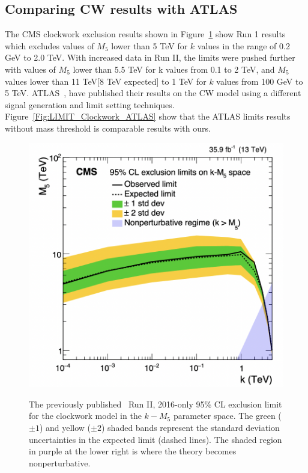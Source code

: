 
\subsection{\label{sec:ATLAS_results} Comparing CW results with ATLAS}

The CMS clockwork exclusion results shown in Figure~\ref{Fig:LIMIT_Clockwork_RUN1} show Run 1 results which excludes values of $M_5$ lower than 5 TeV for $k$ values in the range of 0.2 GeV to 2.0 TeV. With increased data in Run II, the limits were pushed further with values of $M_5$ lower than 5.5 TeV for k values from 0.1 to 2 TeV, and $M_5$ values lower than 11 TeV[8 TeV expected] to 1 TeV for $k$ values from 100 GeV to 5 TeV.  ATLAS~\cite{ATLAS:2023hbp}, have published their results on the CW model using a different signal generation and limit setting techniques. Figure~\ref{Fig:LIMIT_Clockwork_ATLAS} show that the ATLAS limits results without mass threshold is comparable results with ours.


\begin{figure}[!htbp]
\caption{The previously published~\cite{cmsdiphoton2016} Run II, 2016-only 95\% CL exclusion limit for the clockwork model in the $k{-}M_5$ parameter space. The green ($\pm1$) and yellow ($\pm2$) shaded bands represent the standard deviation uncertainties in the expected limit (dashed lines). The shaded region in purple at the lower right is where the theory becomes nonperturbative.}
\centering
\includegraphics[width=0.47\linewidth]{fig/CWCMSI.png}
\label{Fig:LIMIT_Clockwork_RUN1}
\end{figure}



